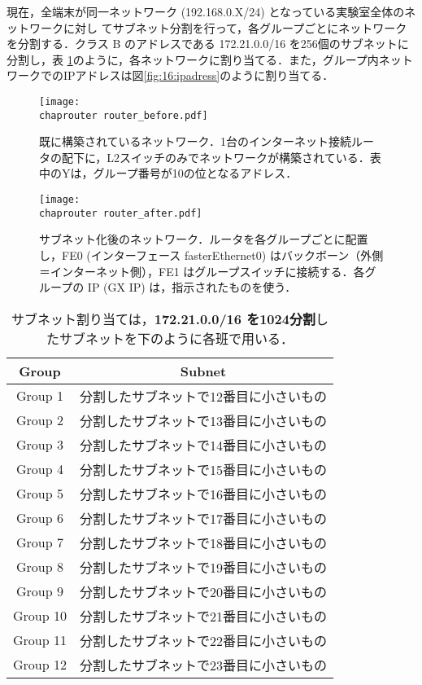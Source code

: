 現在，全端末が同一ネットワーク (192.168.0.X/24) となっている実験室全体のネットワークに対し
てサブネット分割を行って，各グループごとにネットワークを分割する．クラス
B のアドレスである 172.21.0.0/16 を256個のサブネットに分割し，表
\ref{tab:16:subnet}のように，各ネットワークに割り当てる．また，グループ内ネットワークでのIPアドレスは図\ref{fig:16:ipadress}のように割り当てる．

\begin{figure}[tb]
\begin{center}
 \texttt{[image: \\chaprouter router\_before.pdf]}
 \caption{既に構築されているネットワーク．1台のインターネット接続ルータの配下に，L2スイッチのみでネットワークが構築されている．表中のYは，グループ番号が10の位となるアドレス．}
\end{center} 
\end{figure}

\begin{figure}[tb]
\begin{center}
 \texttt{[image: \\chaprouter router\_after.pdf]}
 \caption{サブネット化後のネットワーク．ルータを各グループごとに配置し，FE0 (インターフェース fasterEthernet0) はバックボーン（外側＝インターネット側），FE1 はグループスイッチに接続する．各グループの IP (GX IP) は，指示されたものを使う．}
\end{center} 
\end{figure}

\begin{table}[tb]
    \centering
    \caption{サブネット割り当ては，\textbf{172.21.0.0/16 を1024分割}したサブネットを下のように各班で用いる．}
    \label{tab:16:subnet}
    \begin{tabular}{c|c}
        \hline
         Group & Subnet \\
         \hline
         Group 1 & 分割したサブネットで12番目に小さいもの\\
         Group 2 & 分割したサブネットで13番目に小さいもの\\
         Group 3 & 分割したサブネットで14番目に小さいもの\\
         Group 4 & 分割したサブネットで15番目に小さいもの\\
         Group 5 & 分割したサブネットで16番目に小さいもの\\
         Group 6 & 分割したサブネットで17番目に小さいもの\\
         Group 7 & 分割したサブネットで18番目に小さいもの\\
         Group 8 & 分割したサブネットで19番目に小さいもの\\
         Group 9 & 分割したサブネットで20番目に小さいもの\\
         Group 10 & 分割したサブネットで21番目に小さいもの\\
         Group 11 & 分割したサブネットで22番目に小さいもの\\
         Group 12 & 分割したサブネットで23番目に小さいもの\\
         \hline
    \end{tabular}
\end{table}

